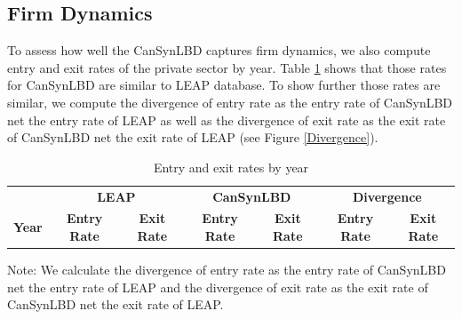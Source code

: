 \subsection{Firm Dynamics}
To assess how well the CanSynLBD captures firm dynamics, we also compute entry and exit rates of the private sector by year. Table \ref{FirmDynamics} shows that those rates for CanSynLBD are similar to LEAP database. To show further those rates are similar, we compute the divergence of entry rate as the entry rate of CanSynLBD net the entry rate of LEAP as well as the divergence of exit rate as the exit rate of CanSynLBD net the exit rate of LEAP (see Figure \ref{Divergence}).

\begin{table}[H]
  \centering
\begin{threeparttable}
 \caption{Entry and exit rates by year} \label{FirmDynamics} \medskip
\renewcommand{\arraystretch}{1}
\begin{tabular}{l|c c| c c| c c}
\toprule
&\multicolumn{2}{c|}{\textbf{LEAP}} &  \multicolumn{2}{c|}{\textbf{CanSynLBD}}&  \multicolumn{2}{c}{\textbf{Divergence}}\\
\textbf{Year}&\textbf{Entry Rate}&\textbf{Exit Rate}&\textbf{Entry Rate}&\textbf{Exit Rate} &\textbf{Entry Rate}&\textbf{Exit Rate}\\
\midrule

   \bottomrule
  \end{tabular} 
\begin{tablenotes}
\small
\item Note: \TableNote  We calculate the divergence of entry rate as the entry rate of CanSynLBD net the entry rate of LEAP and the divergence of exit rate as the exit rate of CanSynLBD net the exit rate of LEAP.
 \end{tablenotes}
 \end{threeparttable}
\end{table}

